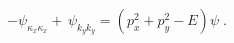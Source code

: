 \begin{equation}
-\psi_{\kappa_x \kappa_x} + \, \psi_{k_y k_y} =
	\left( p^2_x + p^2_y - E \right) \psi \; .
\label{eq:hyperbolic2}
\end{equation}

